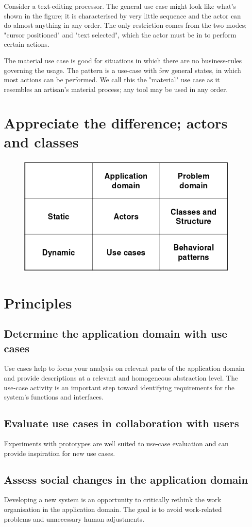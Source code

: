 Consider a text-editing processor. The general use case might look like what's shown in the figure; it is characterised by very little sequence and the actor can do almost anything in any order. The only restriction comes from the two modes; "cursor positioned" and "text selected", which the actor must be in to perform certain actions.

The material use case is good for situations in which there are no business-rules governing the usage. The pattern is a use-case with few general states, in which most actions can be performed. We call this the "material" use case as it resembles an artisan's material process; any tool may be used in any order.

\section{Appreciate the difference; actors and classes}
\begin{figure}[H]
    \centering
    \includegraphics[width=.5\textwidth]{figures/actorvsclasses.png}
\end{figure}

\section{Principles}
\subsection{Determine the application domain with use cases}
Use cases help to focus your analysis on relevant parts of the application domain and provide descriptions at a relevant and homogeneous abstraction level. The use-case activity is an important step toward identifying requirements for the system's functions and interfaces.

\subsection{Evaluate use cases in collaboration with users}
Experiments with prototypes are well suited to use-case evaluation and can provide inspiration for new use cases.

\subsection{Assess social changes in the application domain}
Developing a new system is an opportunity to critically rethink the work organisation in the application domain. The goal is to avoid work-related problems and unnecessary human adjustments.